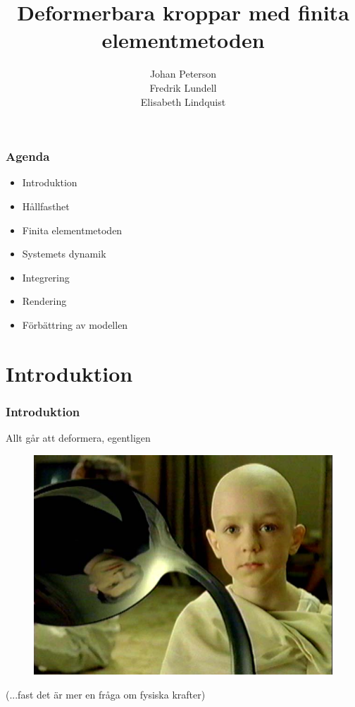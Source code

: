 \documentclass{beamer}
\title{Deformerbara kroppar med finita elementmetoden}
\author{Johan Peterson\\Fredrik Lundell\\Elisabeth Lindquist}
\begin{document}
\begin{frame}
\maketitle
\end{frame}

\begin{frame}
\frametitle{Agenda}
\begin{itemize}
\item Introduktion
\item Hållfasthet
\item Finita elementmetoden
\item Systemets dynamik
\item Integrering
\item Rendering
\item Förbättring av modellen
\end{itemize}

\end{frame}

\section{Introduktion}
\begin{frame}
\frametitle{Introduktion}
\begin{block}{Allt går att deformera, egentligen}
\begin{figure}
\includegraphics[scale=0.05]{photo_movieMatrix-quoteSpoon.png}
\end{figure}
\begin{tiny}
(...fast det är mer en fråga om fysiska krafter)
\end{tiny}
\end{block}
\end{frame}
\end{document}
